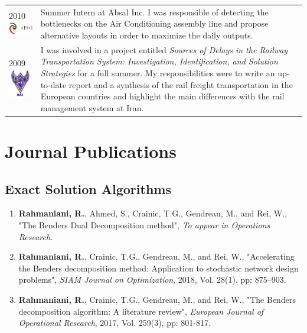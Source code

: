 \documentclass[10PT,letter]{article}
\newcommand{\subsectionstyle}[1]{\normalfont\selectfont\textcolor{titlecol}{\sffamily #1}}
\newcommand{\numbox}[1]{} %
\begin{document}
\begin{tabular}{p{1.2in}p{5.55in}}
						\textsc{2010}\vspace{1mm}\newline \includegraphics[width=1.95cm]{static/logos/ABSAL} &
										Summer Intern  at Absal Inc. 
										I was responsible of detecting the bottlenecks on the Air Conditioning assembly  line and propose alternative  layouts in order to maximize the daily outputs. \\[3mm]
						
						\textsc{2009} \vspace{1mm} \newline \includegraphics[width=1.4cm]{static/logos/RAI} & 
										I was involved in a project entitled \textit{Sources of Delays in the Railway Transportation System: Investigation, Identification, and Solution Strategies} for a full summer. My responsibilities were to write an up-to-date  report and a synthesis of the rail freight transportation in the European countries and highlight the main differences with the rail management system at Iran.  

						
			\end{tabular}

            

\section*{\numbox{3}\bfseries\textcolor{titlecol}{\sffamily Journal Publications }}       
        \subsection*{\subsectionstyle{Exact  Solution Algorithms}}
	        \begin{enumerate}[itemsep=.5mm]
					\item 
								\textbf{Rahmaniani, R.}, Ahmed, S., Crainic, T.G., Gendreau, M., and Rei, W., "The Benders Dual Decomposition method", \textit{To appear in Operations Research}.
					\item 
								\textbf{Rahmaniani, R.}, Crainic, T.G., Gendreau, M., and Rei, W., "Accelerating the Benders decomposition method: Application to stochastic network design problems", \textit{SIAM Journal on Optimization}, 2018, Vol. 28(1), pp: 875–903.
					\item
								 \textbf{Rahmaniani, R.}, Crainic, T.G., Gendreau, M., and Rei, W., "The Benders decomposition algorithm: A literature review", \textit{European Journal of Operational Research}, 2017, Vol. 259(3), pp: 801-817.
			\end{enumerate}
\end{document}

